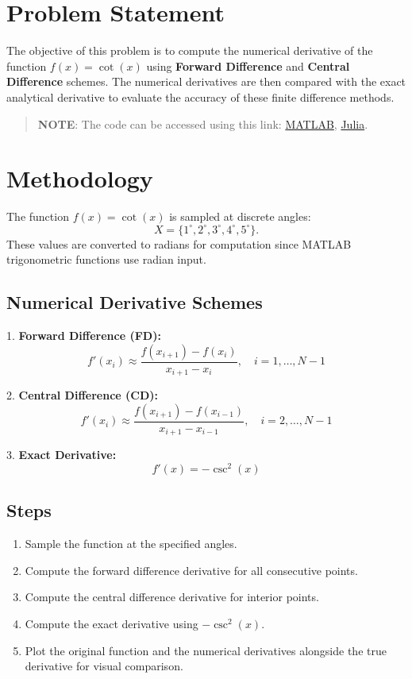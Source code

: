 \section*{Problem Statement}
The objective of this problem is to compute the numerical derivative of the function \(f(x) = \cot(x)\) using \textbf{Forward Difference} and \textbf{Central Difference} schemes. The numerical derivatives are then compared with the exact analytical derivative to evaluate the accuracy of these finite difference methods.

\begin{quote}
  \textbf{NOTE}: The code can be accessed using this link: \href{https://raw.githubusercontent.com/HavokSahil/computational-techniques-assignments/refs/heads/main/assignment5/a3.m}{MATLAB}, \href{https://raw.githubusercontent.com/HavokSahil/computational-techniques-assignments/refs/heads/main/assignment5/a3.jl}{Julia}.
\end{quote}

\section*{Methodology}
The function \(f(x) = \cot(x)\) is sampled at discrete angles:
\[
X = \{1^\circ, 2^\circ, 3^\circ, 4^\circ, 5^\circ\}.
\]
These values are converted to radians for computation since MATLAB trigonometric functions use radian input.

\subsection*{Numerical Derivative Schemes}
1. \textbf{Forward Difference (FD):}
   \[
   f'(x_i) \approx \frac{f(x_{i+1}) - f(x_i)}{x_{i+1} - x_i}, \quad i = 1, \dots, N-1
   \]

2. \textbf{Central Difference (CD):}
   \[
   f'(x_i) \approx \frac{f(x_{i+1}) - f(x_{i-1})}{x_{i+1} - x_{i-1}}, \quad i = 2, \dots, N-1
   \]

3. \textbf{Exact Derivative:}
   \[
   f'(x) = -\csc^2(x)
   \]

\subsection*{Steps}
\begin{enumerate}
    \item Sample the function at the specified angles.
    \item Compute the forward difference derivative for all consecutive points.
    \item Compute the central difference derivative for interior points.
    \item Compute the exact derivative using \(-\csc^2(x)\).
    \item Plot the original function and the numerical derivatives alongside the true derivative for visual comparison.
\end{enumerate}

